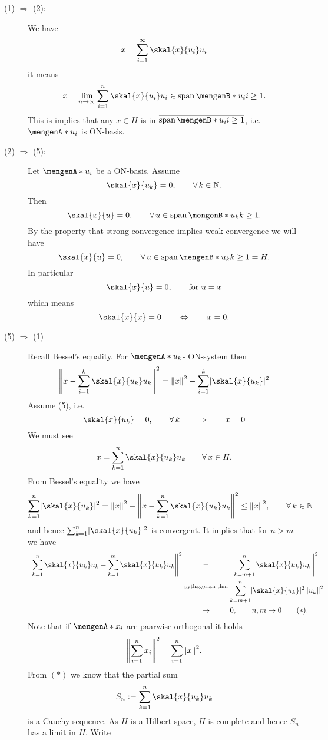\begin{beweis}
 	\begin{description}
 		\item[(1) $\Rightarrow $ (2):] We have 
		\[
			x = \sum^{\infty}_{i=1} \skal{x}{u_i}u_i
		\] 
		it means
		\[
			x = \lim_{n \to \infty} \sum^{n}_{i=1} \skal{x}{u_i}u_i \in \spn\set[u_i]{i \geq 1}.
		\]
		This is implies that any $x \in H$ is in $\overline{\spn \set[u_i]{i \geq 1}}$, i.e. $\set{u_i}$ is ON-basis.
		\item[(2) $\Rightarrow$ (5):] Let $\set{u_i}$ be a ON-basis. Assume 
		\[
			\skal{x}{u_k} = 0, \qquad \forall\,  k \in \mathbb{N}.
		\]
		Then
		\[
			\skal{x}{u} = 0, \qquad \forall\, u \in \spn\set[u_k]{k \geq 1}.
		\]
		By the property that strong convergence implies weak convergence we will have 
		\[
			\skal{x}{u}= 0, \qquad \forall\, u \in \spn\set[u_k]{k \geq 1} = H.
		\]
		In particular
		\[
			\skal{x}{u} = 0, \qquad \text{for }u =x
		\]
		which means
		\[
			\skal{x}{x} = 0 \qquad \Leftrightarrow \qquad  x=0.
		\]
		\item[(5) $\Rightarrow$ (1)] Recall Bessel's equality. For $\set{u_k}$- ON-system then 
		\[
			\norm{x- \sum^{k}_{i=1} \skal{x}{u_k}u_k}^2 = \norm{x}^2 - \sum^{k}_{i=1} \abs{\skal{x}{u_k}}^2
		\]
		Assume (5), i.e.
		\[
			\skal{x}{u_k} = 0, \qquad \forall\, k \qquad \Rightarrow \qquad x = 0
		\]
		We must see
		\[
			x = \sum_{k=1}^{n} \skal{x}{u_k}u_k \qquad \forall\, x \in H.
		\]
		From Bessel's equality we have
		\[
			\sum_{k=1}^{n} \abs{\skal{x}{u_k}}^2 = \norm{x}^2 - \norm{x- \sum_{k=1}^{n} \skal{x}{u_k}u_k}^2 \leq \norm{x}^2, \qquad \forall\, k \in \mathbb{N}
		\]
		and hence $\sum_{k=1}^{n}\abs{\skal{x}{u_k}}^2$ is convergent. It implies that for $n>m$ we have
		\begin{align*}
			\norm{\sum_{k=1}^{n}\skal{x}{u_k}u_k - \sum_{k=1}^{m} \skal{x}{u_k}u_k}^2 
			&\stackrel{\hphantom{\text{pythagorian thm}}}{=} \norm{\sum_{k=m+1}^{n} \skal{x}{u_k}u_k}^2 \\
			&\stackrel{\text{pythagorian thm}}{=} \sum_{k=m+1}^{n} \abs{\skal{x}{u_k}}^2 \norm{u_k}^2 \\
			&\stackrel{\hphantom{\text{pythagorian thm}}}{\to } 0, \qquad n,m \to 0 \qquad (*).
		\end{align*}
		Note that if $\set{x_i}$ are paarwise orthogonal it holds
		\[
			\norm{\sum^{n}_{i=1}x_i}^2 = \sum^{n}_{i=1} \norm{x}^2.
		\]
		From $(*)$ we know that the partial sum
		\[
			S_n := \sum_{k=1}^{n}\skal{x}{u_k}u_k
		\]
		is a Cauchy sequence. As $H$ is a Hilbert space, $H$ is complete and hence $S_n$ has a limit in $H$. Write

\end{description}
\end{beweis}

